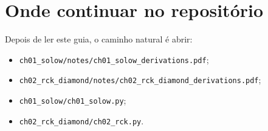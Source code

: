 \documentclass[11pt,a4paper]{article}
\begin{document}
\section{Onde continuar no reposit\'orio}

Depois de ler este guia, o caminho natural \'e abrir:
\begin{itemize}
  \item \texttt{ch01\_solow/notes/ch01\_solow\_derivations.pdf};
  \item \texttt{ch02\_rck\_diamond/notes/ch02\_rck\_diamond\_derivations.pdf};
  \item \texttt{ch01\_solow/ch01\_solow.py};
  \item \texttt{ch02\_rck\_diamond/ch02\_rck.py}.
\end{itemize}
\end{document}
